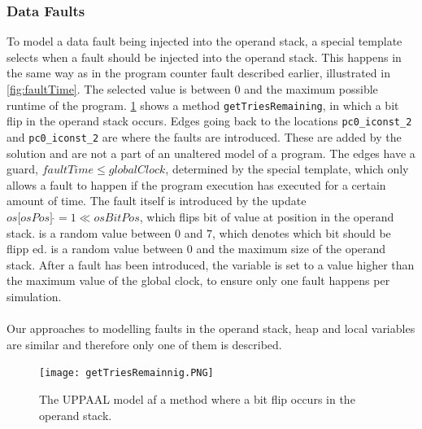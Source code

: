 \subsubsection{Data Faults}
To model a data fault being injected into the operand stack, a special template selects when a fault should be injected into the operand stack. 
This happens in the same way as in the program counter fault described earlier, illustrated in \cref{fig:faultTime}. 
The selected value is between $0$ and the maximum possible runtime of the program.
\cref{fig:opstackFlip} shows a method \texttt{getTriesRemaining}, in which a bit flip in the operand stack occurs.
Edges going back to the locations \texttt{pc0\_iconst\_2} and \texttt{pc0\_iconst\_2} are where the faults are introduced. These are added by the solution and are not a part of an unaltered model of a program. 
The edges have a guard, $faultTime \leq globalClock$, determined by the special template, which only allows a fault to happen if the program execution has executed for a certain amount of time. 
The fault itself is introduced by the update $os\lbrack osPos \rbrack\:\hat{}= 1 \ll osBitPos$, which flips bit  of value at position  in the operand stack.
 is a random value between $0$ and $7$, which denotes which bit should be flipp
ed.  is a random value between $0$ and the maximum size of the operand stack. 
After a fault has been introduced, the variable  is set to a value higher than the maximum value of the global clock, to ensure only one fault happens per simulation.\\\\
Our approaches to modelling faults in the operand stack, heap and local variables are similar and therefore only one of them is described.
\begin{figure}[H]
\centering
\texttt{[image: getTriesRemainnig.PNG]}
\caption{The UPPAAL model af a method where a bit flip occurs in the operand stack.}
\label{fig:opstackFlip}
\end{figure}
